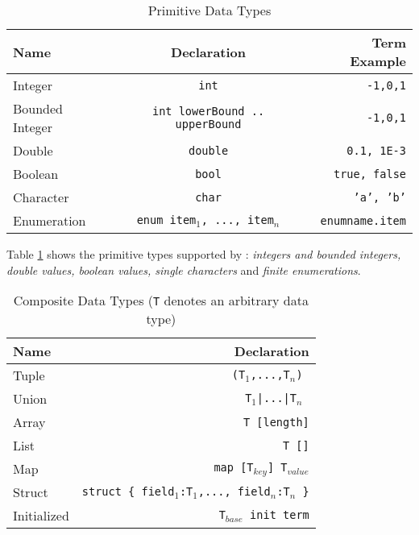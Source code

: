 \begin{table}
    \caption{Primitive Data Types}
    \label{table:primitivetypes}
    \centering
    \begin{tabular}{lcr}
        \hline
        Name & Declaration & Term Example \T\B \\
        \hline
        \T 
        Integer & \texttt{int} & \texttt{-1,0,1} \\
        Bounded Integer\hspace{0.5cm} & \texttt{int lowerBound .. upperBound}\hspace{0.5cm} & \texttt{-1,0,1} \\
        Double & \texttt{double} & \texttt{0.1, 1E-3} \\
        Boolean & \texttt{bool} & \texttt{true, false} \\
        Character & \texttt{char} & \texttt{'a', 'b'} \\
        \B Enumeration & \texttt{enum {item$_1$, ..., item$_n$}} & \texttt{enumname.item} \\
        \hline
    \end{tabular}
\end{table}
Table \ref{table:primitivetypes} shows the primitive types supported by \lang{}: \emph{integers and bounded integers, double values, boolean values, single characters} and \emph{finite enumerations}.
\begin{table}
    \caption{Composite Data Types (\texttt{T} denotes an arbitrary data type)}
    \label{table:compositetypes}
    \centering
    \begin{tabular}{lr}
        \hline
        Name & Declaration \T\B \\
        \hline
        \T Tuple  & \texttt{(T$_1$,...,T$_n$) }\\
        Union & \texttt{T$_1$|...|T$_n$ } \\
        Array & \texttt{T [length]}\\
        List & \texttt{T []} \\
        Map & \texttt{map [T$_{key}$] T$_{value}$} \\
        Struct\hspace{1cm} & \texttt{struct \{ field$_1$:T$_1$,..., field$_n$:T$_n$ \}} \\
        \B Initialized & \texttt{T$_{base}$ init term} \\
        \hline
    \end{tabular}
\end{table}

